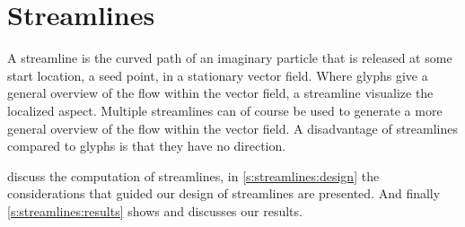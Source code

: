 \chapter{Streamlines} %
\label{cha:streamlines}

A streamline is the curved path of an imaginary particle that is released at some start location, a seed point, in a stationary vector field\cite{telea2014data}. Where glyphs give a general overview of the flow within the vector field, a streamline visualize the localized aspect. Multiple streamlines can of course be used to generate a more general overview of the flow within the vector field. A disadvantage of streamlines compared to glyphs is that they have no direction. 

 discuss the computation of streamlines, in \cref{s:streamlines:design} the considerations that guided our design of streamlines are presented. And finally \cref{s:streamlines:results} shows and discusses our results.







